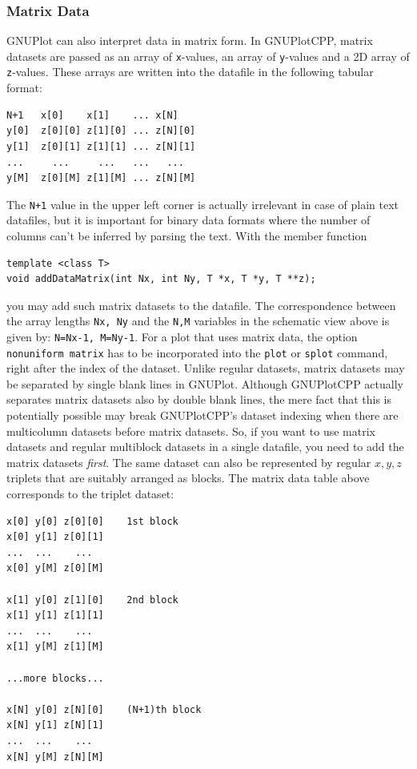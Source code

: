 \documentclass[11pt]{article}
\begin{document}
\subsubsection{Matrix Data}
GNUPlot can also interpret data in matrix form. In GNUPlotCPP, matrix datasets are passed as an array of \texttt{x}-values, an array of \texttt{y}-values and a 2D array of \texttt{z}-values. These arrays are written into the datafile in the following tabular format:
\begin{verbatim}
N+1   x[0]    x[1]    ... x[N]
y[0]  z[0][0] z[1][0] ... z[N][0]
y[1]  z[0][1] z[1][1] ... z[N][1]
...     ...     ...   ...   ...
y[M]  z[0][M] z[1][M] ... z[N][M] 
\end{verbatim}
The \texttt{N+1} value in the upper left corner is actually irrelevant in case of plain text datafiles, but it is important for binary data formats where the number of columns can't be inferred by parsing the text. With the member function
\begin{verbatim}
template <class T>
void addDataMatrix(int Nx, int Ny, T *x, T *y, T **z);
\end{verbatim}
you may add such matrix datasets to the datafile. The correspondence between the array lengths \texttt{Nx, Ny} and the \texttt{N,M} variables in the schematic view above is given by: \texttt{N=Nx-1, M=Ny-1}. For a plot that uses matrix data, the option \texttt{nonuniform matrix} has to be incorporated into the \texttt{plot} or \texttt{splot} command, right after the index of the dataset. Unlike regular datasets, matrix datasets may be separated by single blank lines in GNUPlot. Although GNUPlotCPP actually separates matrix datasets also by double blank lines, the mere fact that this is potentially possible may break GNUPlotCPP's dataset indexing when there are multicolumn datasets before matrix datasets. So, if you want to use matrix datasets and regular multiblock datasets in a single datafile, you need to add the matrix datasets \emph{first}. The same dataset can also be represented by regular $x,y,z$ triplets that are suitably arranged as blocks. The matrix data table above corresponds to the triplet dataset:
\begin{verbatim}
x[0] y[0] z[0][0]    1st block
x[0] y[1] z[0][1]
...  ...    ...
x[0] y[M] z[0][M]

x[1] y[0] z[1][0]    2nd block
x[1] y[1] z[1][1]
...  ...    ...
x[1] y[M] z[1][M]

...more blocks...

x[N] y[0] z[N][0]    (N+1)th block
x[N] y[1] z[N][1]
...  ...    ...
x[N] y[M] z[N][M] 
\end{verbatim}
\end{document}
